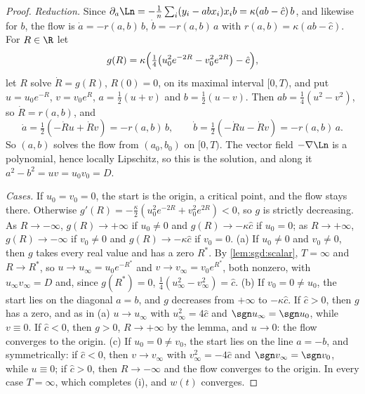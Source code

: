 \begin{refsection}
\begin{proof}
\emph{Reduction.} Since $\partial_a\Ln=-\frac1n\sum_i(y_i-abx_i)x_ib=\kappa(ab-\hat c)\,b$, and likewise for $b$, the flow is $\dot a=-r(a,b)\,b$, $\dot b=-r(a,b)\,a$ with $r(a,b)=\kappa(ab-\hat c)$. For $R\in\R$ let
\[
g(R)=\kappa\Bigl(\tfrac14\bigl(u_0^2e^{-2R}-v_0^2e^{2R}\bigr)-\hat c\Bigr),
\]
let $R$ solve $\dot R=g(R)$, $R(0)=0$, on its maximal interval $[0,T)$, and put $u=u_0e^{-R}$, $v=v_0e^{R}$, $a=\frac12(u+v)$ and $b=\frac12(u-v)$. Then $ab=\frac14(u^2-v^2)$, so $\dot R=r(a,b)$, and
\[
\dot a=\tfrac12(-\dot Ru+\dot Rv)=-r(a,b)\,b,\qquad\dot b=\tfrac12(-\dot Ru-\dot Rv)=-r(a,b)\,a .
\]
So $(a,b)$ solves the flow from $(a_0,b_0)$ on $[0,T)$. The vector field $-\nabla\Ln$ is a polynomial, hence locally Lipschitz, so this is the solution, and along it $a^2-b^2=uv=u_0v_0=D$.

\emph{Cases.} If $u_0=v_0=0$, the start is the origin, a critical point, and the flow stays there. Otherwise $g'(R)=-\frac\kappa2(u_0^2e^{-2R}+v_0^2e^{2R})<0$, so $g$ is strictly decreasing. As $R\to-\infty$, $g(R)\to+\infty$ if $u_0\ne0$ and $g(R)\to-\kappa\hat c$ if $u_0=0$; as $R\to+\infty$, $g(R)\to-\infty$ if $v_0\ne0$ and $g(R)\to-\kappa\hat c$ if $v_0=0$.
(a) If $u_0\ne0$ and $v_0\ne0$, then $g$ takes every real value and has a zero $R^*$. By \cref{lem:sgd:scalar}, $T=\infty$ and $R\to R^*$, so $u\to u_\infty=u_0e^{-R^*}$ and $v\to v_\infty=v_0e^{R^*}$, both nonzero, with $u_\infty v_\infty=D$ and, since $g(R^*)=0$, $\frac14(u_\infty^2-v_\infty^2)=\hat c$.
(b) If $v_0=0\ne u_0$, the start lies on the diagonal $a=b$, and $g$ decreases from $+\infty$ to $-\kappa\hat c$. If $\hat c>0$, then $g$ has a zero, and as in (a) $u\to u_\infty$ with $u_\infty^2=4\hat c$ and $\sgn u_\infty=\sgn u_0$, while $v\equiv0$. If $\hat c<0$, then $g>0$, $R\to+\infty$ by the lemma, and $u\to0$: the flow converges to the origin.
(c) If $u_0=0\ne v_0$, the start lies on the line $a=-b$, and symmetrically: if $\hat c<0$, then $v\to v_\infty$ with $v_\infty^2=-4\hat c$ and $\sgn v_\infty=\sgn v_0$, while $u\equiv0$; if $\hat c>0$, then $R\to-\infty$ and the flow converges to the origin.
In every case $T=\infty$, which completes (i), and $w(t)$ converges.


\end{proof}
\end{refsection}
